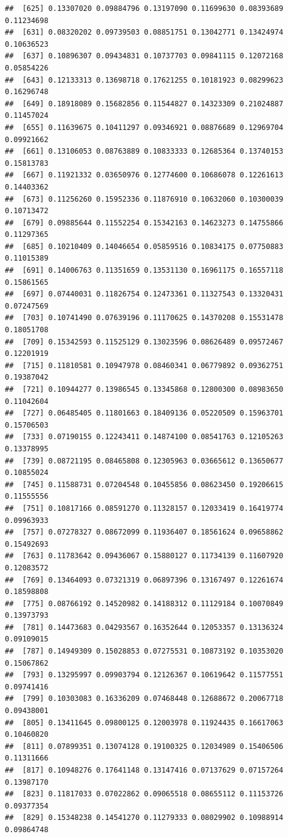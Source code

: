 \documentclass[
]{article}
\begin{document}
\begin{verbatim}
##  [625] 0.13307020 0.09884796 0.13197090 0.11699630 0.08393689 0.11234698
##  [631] 0.08320202 0.09739503 0.08851751 0.13042771 0.13424974 0.10636523
##  [637] 0.10896307 0.09434831 0.10737703 0.09841115 0.12072168 0.05854226
##  [643] 0.12133313 0.13698718 0.17621255 0.10181923 0.08299623 0.16296748
##  [649] 0.18918089 0.15682856 0.11544827 0.14323309 0.21024887 0.11457024
##  [655] 0.11639675 0.10411297 0.09346921 0.08876689 0.12969704 0.09921662
##  [661] 0.13106053 0.08763889 0.10833333 0.12685364 0.13740153 0.15813783
##  [667] 0.11921332 0.03650976 0.12774600 0.10686078 0.12261613 0.14403362
##  [673] 0.11256260 0.15952336 0.11876910 0.10632060 0.10300039 0.10713472
##  [679] 0.09885644 0.11552254 0.15342163 0.14623273 0.14755866 0.11297365
##  [685] 0.10210409 0.14046654 0.05859516 0.10834175 0.07750883 0.11015389
##  [691] 0.14006763 0.11351659 0.13531130 0.16961175 0.16557118 0.15861565
##  [697] 0.07440031 0.11826754 0.12473361 0.11327543 0.13320431 0.07247569
##  [703] 0.10741490 0.07639196 0.11170625 0.14370208 0.15531478 0.18051708
##  [709] 0.15342593 0.11525129 0.13023596 0.08626489 0.09572467 0.12201919
##  [715] 0.11810581 0.10947978 0.08460341 0.06779892 0.09362751 0.19387042
##  [721] 0.10944277 0.13986545 0.13345868 0.12800300 0.08983650 0.11042604
##  [727] 0.06485405 0.11801663 0.18409136 0.05220509 0.15963701 0.15706503
##  [733] 0.07190155 0.12243411 0.14874100 0.08541763 0.12105263 0.13378995
##  [739] 0.08721195 0.08465808 0.12305963 0.03665612 0.13650677 0.10855024
##  [745] 0.11588731 0.07204548 0.10455856 0.08623450 0.19206615 0.11555556
##  [751] 0.10817166 0.08591270 0.11328157 0.12033419 0.16419774 0.09963933
##  [757] 0.07278327 0.08672099 0.11936407 0.18561624 0.09658862 0.15492693
##  [763] 0.11783642 0.09436067 0.15880127 0.11734139 0.11607920 0.12083572
##  [769] 0.13464093 0.07321319 0.06897396 0.13167497 0.12261674 0.18598808
##  [775] 0.08766192 0.14520982 0.14188312 0.11129184 0.10070849 0.13973793
##  [781] 0.14473683 0.04293567 0.16352644 0.12053357 0.13136324 0.09109015
##  [787] 0.14949309 0.15028853 0.07275531 0.10873192 0.10353020 0.15067862
##  [793] 0.13295997 0.09903794 0.12126367 0.10619642 0.11577551 0.09741416
##  [799] 0.10303083 0.16336209 0.07468448 0.12688672 0.20067718 0.09438001
##  [805] 0.13411645 0.09800125 0.12003978 0.11924435 0.16617063 0.10460820
##  [811] 0.07899351 0.13074128 0.19100325 0.12034989 0.15406506 0.11311666
##  [817] 0.10948276 0.17641148 0.13147416 0.07137629 0.07157264 0.13987170
##  [823] 0.11817033 0.07022862 0.09065518 0.08655112 0.11153726 0.09377354
##  [829] 0.15348238 0.14541270 0.11279333 0.08029902 0.10988914 0.09864748

\end{verbatim}
\end{document}
